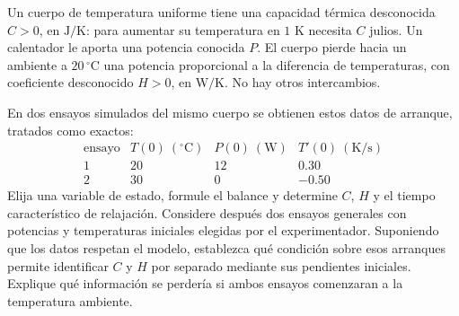 Un cuerpo de temperatura uniforme tiene una capacidad térmica desconocida \(C>0\), en \(\mathrm{J/K}\): para aumentar su temperatura en \(1\) K necesita \(C\) julios. Un calentador le aporta una potencia conocida \(P\). El cuerpo pierde hacia un ambiente a \(20\,{}^\circ\mathrm C\) una potencia proporcional a la diferencia de temperaturas, con coeficiente desconocido \(H>0\), en \(\mathrm{W/K}\). No hay otros intercambios.

En dos ensayos simulados del mismo cuerpo se obtienen estos datos de arranque, tratados como exactos:
\[
\begin{array}{c|ccc}
\text{ensayo}&T(0)\ ({}^\circ\mathrm C)&P(0)\ (\mathrm W)&T'(0)\ (\mathrm{K/s})\\\hline
1&20&12&0.30\\
2&30&0&-0.50
\end{array}
\]
Elija una variable de estado, formule el balance y determine \(C\), \(H\) y el tiempo característico de relajación. Considere después dos ensayos generales con potencias y temperaturas iniciales elegidas por el experimentador. Suponiendo que los datos respetan el modelo, establezca qué condición sobre esos arranques permite identificar \(C\) y \(H\) por separado mediante sus pendientes iniciales. Explique qué información se perdería si ambos ensayos comenzaran a la temperatura ambiente.
